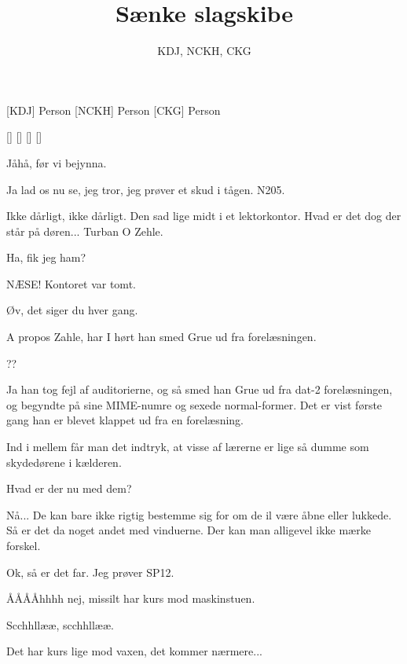 \documentclass[a4paper,11pt]{article}
\title{Sænke slagskibe}
\author{KDJ, NCKH, CKG}
\begin{document}
\maketitle

\begin{roles}
[KDJ] Person
[NCKH] Person
[CKG] Person
\end{roles}

\begin{props}
[]
[]
[]
[]
\end{props}


\begin{sketch}

 Jåhå, før vi bejynna.

 Ja lad os nu se, jeg tror, jeg prøver et skud i tågen. N205.


 Ikke dårligt, ikke dårligt. Den sad lige midt i et lektorkontor. Hvad
er det dog der står på døren... Turban O Zehle.

 Ha, fik jeg ham?

 NÆSE! Kontoret var tomt.

 Øv, det siger du hver gang.

 A propos Zahle, har I hørt han smed Grue ud fra forelæsningen.

 ??

 Ja han tog fejl af auditorierne, og så smed han Grue ud fra dat-2
forelæsningen, og begyndte på sine MIME-numre og sexede normal-former. Det er
vist første gang han er blevet klappet ud fra en forelæsning.

 Ind i mellem får man det indtryk, at visse af lærerne er lige så dumme
som skydedørene i kælderen.

 Hvad er der nu med dem?

 Nå... De kan bare ikke rigtig bestemme sig for om de il være åbne eller
lukkede. Så er det da noget andet med vinduerne. Der kan man alligevel ikke
mærke forskel.

 Ok, så er det far. Jeg prøver SP12.

 ÅÅÅÅhhhh nej, missilt har kurs mod maskinstuen.

 Scchhllææ, scchhllææ.

 Det har kurs lige mod vaxen, det kommer nærmere...


\end{sketch}
\end{document}
